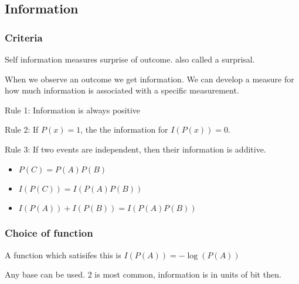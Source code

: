 
\subsection{Information}

\subsubsection{Criteria}

Self information measures surprise of outcome. also called a surprisal.

When we observe an outcome we get information. We can develop a measure for how much information is associated with a specific measurement.

Rule 1: Information is always positive

Rule 2: If \(P(x)=1\), the the information for \(I(P(x))=0\).

Rule 3: If two events are independent, then their information is additive.

\begin{itemize}
\item \(P(C)=P(A)P(B)\)
\item \(I(P(C))=I(P(A)P(B))\)
\item \(I(P(A))+I(P(B))=I(P(A)P(B))\)
\end{itemize}

\subsubsection{Choice of function}

A function which satisifes this is \(I(P(A))=-\log(P(A))\)

Any base can be used. 2 is most common, information is in units of bit then.

